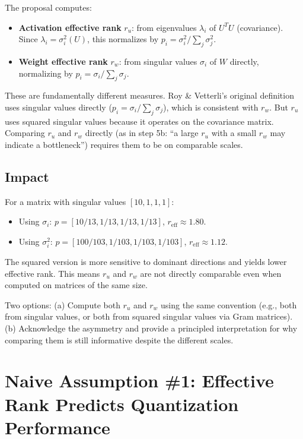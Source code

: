 \documentclass[11pt,a4paper]{article}
\begin{document}
The proposal computes:
\begin{itemize}
    \item \textbf{Activation effective rank} $r_u$: from eigenvalues $\lambda_i$ of $U^T U$ (covariance). Since $\lambda_i = \sigma_i^2(U)$, this normalizes by $p_i = \sigma_i^2 / \sum_j \sigma_j^2$.
    \item \textbf{Weight effective rank} $r_w$: from singular values $\sigma_i$ of $W$ directly, normalizing by $p_i = \sigma_i / \sum_j \sigma_j$.
\end{itemize}

These are fundamentally different measures. Roy \& Vetterli's original definition \cite{roy2007effective} uses singular values directly ($p_i = \sigma_i / \sum_j \sigma_j$), which is consistent with $r_w$. But $r_u$ uses squared singular values because it operates on the covariance matrix. Comparing $r_u$ and $r_w$ directly (as in step 5b: ``a large $r_u$ with a small $r_w$ may indicate a bottleneck'') requires them to be on comparable scales.

\subsection{Impact}

For a matrix with singular values $[10, 1, 1, 1]$:
\begin{itemize}
    \item Using $\sigma_i$: $p = [10/13, 1/13, 1/13, 1/13]$, $r_{\text{eff}} \approx 1.80$.
    \item Using $\sigma_i^2$: $p = [100/103, 1/103, 1/103, 1/103]$, $r_{\text{eff}} \approx 1.12$.
\end{itemize}

The squared version is more sensitive to dominant directions and yields lower effective rank. This means $r_u$ and $r_w$ are not directly comparable even when computed on matrices of the same size.

\begin{fixbox}
Two options: (a) Compute both $r_u$ and $r_w$ using the same convention (e.g., both from singular values, or both from squared singular values via Gram matrices). (b) Acknowledge the asymmetry and provide a principled interpretation for why comparing them is still informative despite the different scales.
\end{fixbox}

\section{Naive Assumption \#1: Effective Rank Predicts Quantization Performance}
\end{document}
